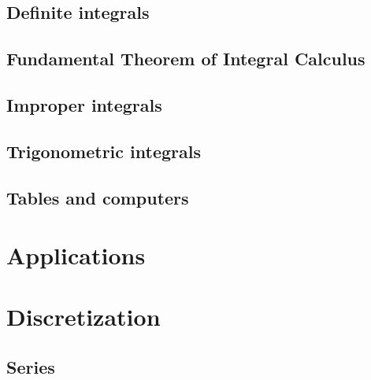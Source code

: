 \documentclass[twoside,openright,titlepage,a4paper]{book}
\begin{document}
\begin{sloppypar}
\section{Definite integrals} \label{ChIntegrationSecDefiniteIntegrals}
\section{Fundamental Theorem of Integral Calculus} \label{ChIntegrationSecFundamentalTheoremOfIntegralCalculus}
\section{Improper integrals} \label{ChIntegrationSecImproperIntegrals}
\section{Trigonometric integrals} \label{ChIntegrationSecTrigonometricIntegrals}
\section{Tables and computers} \label{ChIntegrationSecTablesAndComputers}

\chapter{Applications} \label{ChApplications}

\chapter{Discretization} \label{ChDiscretization}
\section{Series} \label{ChDiscretizationSecSeries}

\end{sloppypar}
\end{document}
